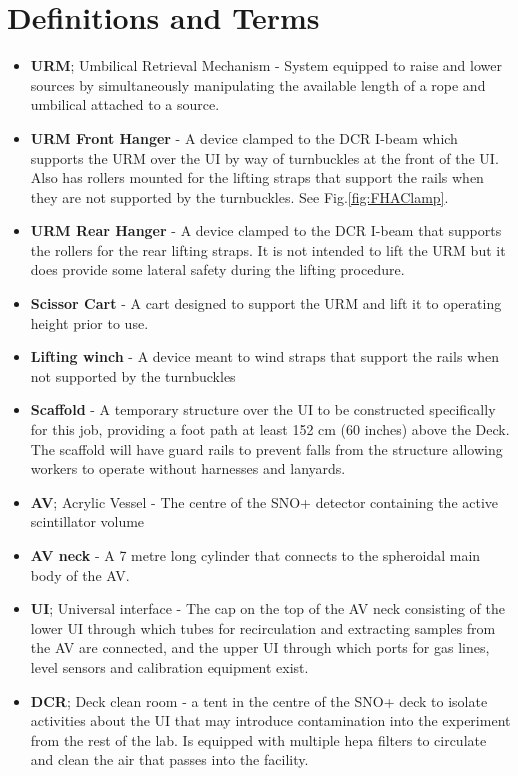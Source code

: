 \documentclass[11pt]{article}
\begin{document}
\section{Definitions and Terms}
\begin{itemize}
\item {\bf URM}; Umbilical Retrieval Mechanism - System equipped to raise and lower sources by simultaneously manipulating the available length of a rope and umbilical attached to a source. 
\item {\bf URM Front Hanger} - A device clamped to the DCR I-beam which supports the URM over the UI by way of turnbuckles at the front of the UI. Also has rollers mounted for the lifting straps that support the rails when they are not supported by the turnbuckles. See Fig.\ref{fig:FHAClamp}.
\item {\bf URM Rear Hanger} - A device clamped to the DCR I-beam that supports the rollers for the rear lifting straps. It is not intended to lift the URM but it does provide some lateral safety during the lifting procedure. 
\item {\bf Scissor Cart} - A cart designed to support the URM and lift it to operating height prior to use. 
\item {\bf Lifting winch} - A device meant to wind straps that support the rails when not supported by the turnbuckles
\item {\bf Scaffold} - A temporary structure over the UI to be constructed specifically for this job, providing a foot path at least 152 cm (60 inches) above the Deck. The scaffold will have guard rails to prevent falls from the structure allowing workers to operate without harnesses and lanyards.
\item {\bf AV}; Acrylic Vessel - The centre of the SNO+ detector containing the active scintillator volume
\item {\bf AV neck} - A 7 metre long cylinder that connects to the spheroidal main body of the AV. 
\item {\bf UI}; Universal interface - The cap on the top of the AV neck consisting of the lower UI through which tubes for recirculation and extracting samples from the AV are connected, and the upper UI through which ports for gas lines, level sensors and calibration equipment exist. 
\item {\bf DCR}; Deck clean room - a tent in the centre of the SNO+ deck to isolate activities about the UI that may introduce contamination into the experiment from the rest of the lab. Is equipped with multiple hepa filters to circulate and clean the air that passes into the facility. 

\end{itemize}
\end{document}
